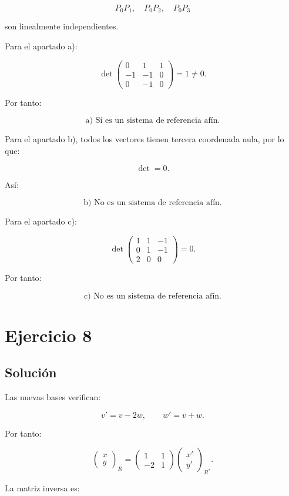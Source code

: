 \documentclass[11pt,a4paper]{article}
\begin{document}
\[
P_0P_1,\quad P_0P_2,\quad P_0P_3
\]

son linealmente independientes.

Para el apartado a):

\[
\det
\begin{pmatrix}
0&1&1\\
-1&-1&0\\
0&-1&0
\end{pmatrix}
=1\neq0.
\]

Por tanto:

\[
\boxed{
\text{a) Sí es un sistema de referencia afín.}
}
\]

Para el apartado b), todos los vectores tienen tercera coordenada nula, por lo que:

\[
\det=0.
\]

Así:

\[
\boxed{
\text{b) No es un sistema de referencia afín.}
}
\]

Para el apartado c):

\[
\det
\begin{pmatrix}
1&1&-1\\
0&1&-1\\
2&0&0
\end{pmatrix}
=0.
\]

Por tanto:

\[
\boxed{
\text{c) No es un sistema de referencia afín.}
}
\]

\section{Ejercicio 8}
\subsection{Solución}

Las nuevas bases verifican:

\[
v'=v-2w,
\qquad
w'=v+w.
\]

Por tanto:

\[
\begin{pmatrix}
x\\
y
\end{pmatrix}_{R}
=
\begin{pmatrix}
1&1\\
-2&1
\end{pmatrix}
\begin{pmatrix}
x'\\
y'
\end{pmatrix}_{R^*}.
\]

La matriz inversa es:
\end{document}
